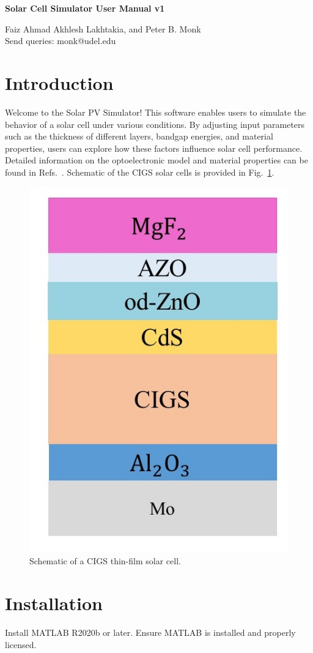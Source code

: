 \documentclass[10pt]{article}
\begin{document}
\begin{center}

\LARGE{ {\bf Solar Cell Simulator User Manual v1
}}
\end{center}
\begin{center}
\vspace{10mm} %

Faiz Ahmad
Akhlesh  Lakhtakia, and Peter B. Monk\\
{Send queries: monk@udel.edu}\\
\normalsize

 
\end{center}
\section{Introduction}
Welcome to the Solar PV Simulator! This software enables users to simulate the behavior of a solar cell under various conditions. By adjusting input parameters such as the thickness of different layers, bandgap energies, and material properties, users can explore how these factors influence solar cell performance. Detailed information on the optoelectronic model and material properties can be found in Refs.~\cite{Anderson2020, SolCellBook, Ahmad2022-2}. Schematic of the CIGS solar cells is provided in Fig.~\ref{Fig1}.


\begin{figure}[h] 
	\centering   
	\includegraphics[width=0.4\columnwidth]{CIGS-Schematic} 
	\caption{ Schematic of a CIGS thin-film  solar cell.
		\label{Fig1} }
\end{figure}


\section{Installation}
Install MATLAB R2020b or later. Ensure MATLAB is installed and properly licensed.
\end{document}
